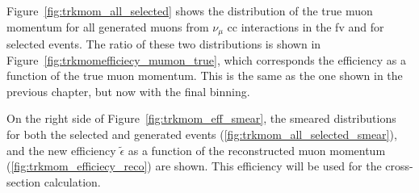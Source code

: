 Figure~\ref{fig:trkmom_all_selected} shows the distribution of the true muon momentum for all generated muons from $\nu_{\mu}$ \acrshort{cc} interactions in the \acrshort{fv} and for selected events. The ratio of these two distributions is shown in Figure~\ref{fig:trkmomefficiecy_mumon_true}, which corresponds the efficiency as a function of the true muon momentum. This is the same as the one shown in the previous chapter, but now with the final binning. 

On the right side of Figure~\ref{fig:trkmom_eff_smear}, the smeared distributions for both the selected and generated events (\ref{fig:trkmom_all_selected_smear}), and the new efficiency $\tilde{\epsilon}$ as a function of the reconstructed muon momentum (\ref{fig:trkmom_efficiecy_reco}) are shown. This efficiency will be used for the cross-section calculation.

